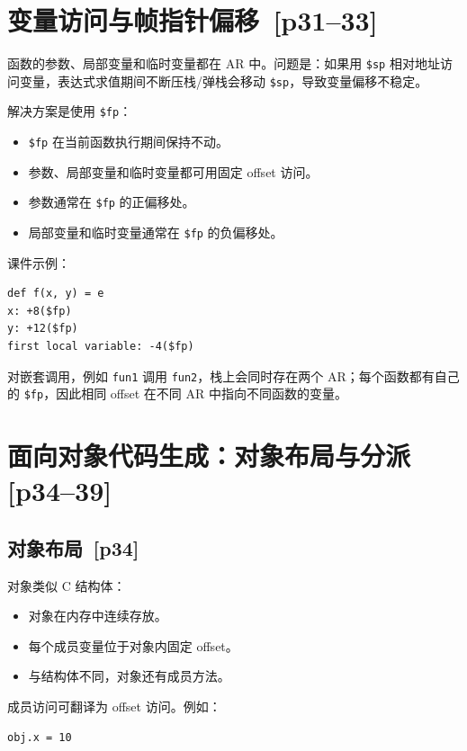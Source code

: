 \documentclass[UTF8,fontset=none,11pt]{ctexart}
\newcommand{\pg}[1]{\texorpdfstring{{\small\color{graytext}\,[p#1]}}{ [p#1]}}
\begin{document}
\section{变量访问与帧指针偏移 \pg{31--33}}

函数的参数、局部变量和临时变量都在 AR 中。问题是：如果用 \texttt{\$sp} 相对地址访问变量，表达式求值期间不断压栈/弹栈会移动 \texttt{\$sp}，导致变量偏移不稳定。

解决方案是使用 \texttt{\$fp}：

\begin{itemize}
  \item \texttt{\$fp} 在当前函数执行期间保持不动。
  \item 参数、局部变量和临时变量都可用固定 offset 访问。
  \item 参数通常在 \texttt{\$fp} 的正偏移处。
  \item 局部变量和临时变量通常在 \texttt{\$fp} 的负偏移处。
\end{itemize}

课件示例：

\begin{verbatim}
def f(x, y) = e
x: +8($fp)
y: +12($fp)
first local variable: -4($fp)
\end{verbatim}

对嵌套调用，例如 \texttt{fun1} 调用 \texttt{fun2}，栈上会同时存在两个 AR；每个函数都有自己的 \texttt{\$fp}，因此相同 offset 在不同 AR 中指向不同函数的变量。

\section{面向对象代码生成：对象布局与分派 \pg{34--39}}

\subsection{对象布局 \pg{34}}

对象类似 C 结构体：

\begin{itemize}
  \item 对象在内存中连续存放。
  \item 每个成员变量位于对象内固定 offset。
  \item 与结构体不同，对象还有成员方法。
\end{itemize}

成员访问可翻译为 offset 访问。例如：

\begin{verbatim}
obj.x = 10
\end{verbatim}
\end{document}
